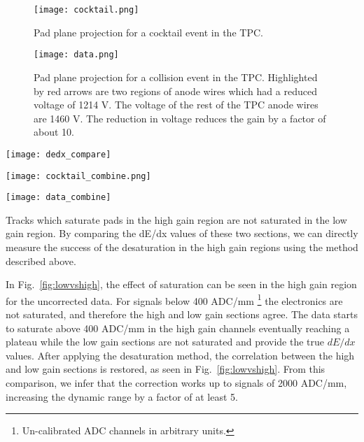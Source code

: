 \begin{figure}[ht!]
\texttt{[image: cocktail.png]}
\caption{Pad plane projection for a cocktail event in the TPC.}
\label{fig:cocktail}
\end{figure}

\begin{figure}[ht!]
\texttt{[image: data.png]}
\caption{Pad plane projection for a collision event in the TPC. Highlighted by red arrows are two regions of anode wires which had a reduced voltage of 1214 V. The voltage of the rest of the TPC anode wires are 1460 V. The reduction in voltage reduces the gain by a factor of about 10. }
\label{fig:data}
\end{figure}


\begin{figure*}[t]
\centering
\texttt{[image: dedx\_compare]}
\caption{The left panel shows the high gain stopping power vs low gain when the method of desaturation was not applied. In the right panel the desaturation technique was applied to the high gain region. The low gain does not suffer from saturation and represents the true $dE/dx$ value.}
\label{fig:lowvshigh}
\end{figure*}

\begin{figure*}[t]
\texttt{[image: cocktail\_combine.png]}
\caption{Uncorrected (left panel) and desaturated (right panel) cocktail data.}
\label{fig:cocktail_combine}
\end{figure*}

\begin{figure*}[t]
\texttt{[image: data\_combine]}
\caption{Uncorrected (left panel) and desaturated (right panel) collision data at polar angles of $\theta < 40^{\circ}$ and azimuthal angles between $-80^{\circ} < \phi < 80^{\circ}$}
\label{fig:data_combine}
\end{figure*}

Tracks which saturate pads in the high gain region are not saturated in the low gain region. By comparing the dE/dx values of these two sections, we can directly measure the success of the desaturation in the high gain regions using the method described above.  
 
In Fig.~\ref{fig:lowvshigh}, the effect of saturation can be seen in the high gain region for the uncorrected data. For signals below 400 ADC/mm \footnote{Un-calibrated ADC channels in arbitrary units.} the electronics are not saturated, and therefore the high and low gain sections agree. The data starts to saturate above 400 ADC/mm in the high gain channels eventually reaching a plateau while the low gain sections are not saturated and provide the true $dE/dx$ values.
 After applying the desaturation method, the correlation between the high and low gain sections is restored, as seen in Fig.~\ref{fig:lowvshigh}. From this comparison, we infer that the correction works up to signals of 2000 ADC/mm, increasing the dynamic range by a factor of at least 5.


